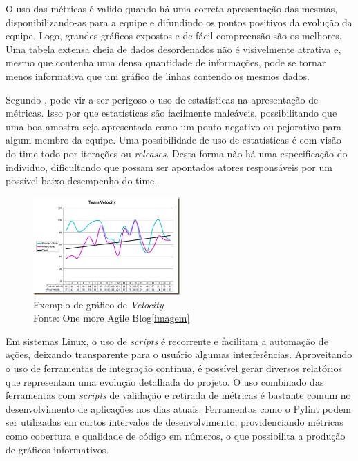 O uso das métricas  é valido quando há uma correta apresentação das mesmas, disponibilizando-as para a equipe e difundindo os pontos positivos da evolução da equipe. Logo, grandes gráficos expostos e de fácil compreensão são os melhores. Uma tabela extensa cheia de dados desordenados não é visivelmente atrativa e, mesmo que contenha uma densa quantidade de informações, pode se tornar menos informativa que um gráfico de linhas contendo os mesmos dados.

Segundo \cite{crispin2009agile}, pode vir a ser perigoso o uso de estatísticas na apresentação de métricas. Isso por que estatísticas são facilmente maleáveis, possibilitando que uma boa amostra seja apresentada como um ponto negativo ou pejorativo para algum membro da equipe. Uma possibilidade de uso de estatísticas é com visão do time todo por iterações ou \textit{releases}. Desta forma não há uma especificação do individuo, dificultando que possam ser apontados atores responsáveis por um possível baixo desempenho do time.


\begin{figure}[h]
	\centering
	\includegraphics[width=0.5\textwidth]{conteudo/velocity}
	\caption{Exemplo de gráfico de \textit{Velocity}\\Fonte: One more Agile Blog\cref{imagem}}
\end{figure}

Em sistemas Linux, o uso de \textit{scripts} é recorrente e facilitam a automação de ações, deixando transparente para o usuário algumas interferências\cite{Advpdf}. Aproveitando o uso de ferramentas de integração continua, é possível gerar diversos relatórios que representam uma evolução detalhada do projeto. O uso combinado das ferramentas com \textit{scripts} de validação e retirada de métricas é bastante comum no desenvolvimento de aplicações nos dias atuais. Ferramentas como o Pylint podem ser utilizadas em curtos intervalos de desenvolvimento, providenciando métricas como cobertura e qualidade de código em números, o que possibilita a produção de gráficos informativos.
